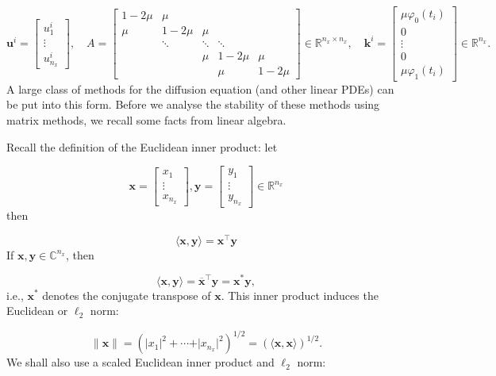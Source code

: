 \documentclass[12pt,landscape]{article}
\begin{document}
{\[
\mathbf{u}^i = \begin{bmatrix}
u^{i}_{1} \\
\vdots \\
u^{i}_{n_x}
\end{bmatrix}, \quad A = \begin{bmatrix}
1 - 2\mu & \mu & & & \\
\mu  & 1-2\mu & \mu  & & \\
      & \ddots & \ddots & \ddots & \\
      &        & \mu    & 1- 2\mu & \mu \\
      &        &        &\mu      & 1-2\mu
\end{bmatrix} \in \mathbb{R}^{n_x \times n_x}, \quad \mathbf{k}^i=
\begin{bmatrix}
\mu\varphi_0(t_i) \\
0 \\
\vdots \\
0 \\
\mu \varphi_1(t_i)
\end{bmatrix} \in \mathbb{R}^{n_x}.
\]
A large class of methods for the diffusion equation (and other linear PDEs) can be put into this form.  Before we analyse the stability of these methods using matrix methods, we recall some facts from linear algebra.

Recall the definition of the Euclidean inner product: let

\[
\mathbf{x} = \begin{bmatrix}
x_1 \\
\vdots \\
x_{n_x}
\end{bmatrix},  \mathbf{y} = \begin{bmatrix}
y_1 \\
\vdots \\
y_{n_x}
\end{bmatrix}  \in \mathbb{R}^{n_x}
\]
then

\[
\langle \mathbf{x}, \mathbf{y}\rangle = \mathbf{x}^{\top}\mathbf{y}
\]
If $\mathbf{x}, \mathbf{y} \in \mathbb{C}^{n_x}$, then

\[
\langle \mathbf{x}, \mathbf{y}\rangle = \overline{\mathbf{x}}^{\top}\mathbf{y} = \mathbf{x}^*\mathbf{y},
\]
i.e., $\mathbf{x}^*$ denotes the conjugate transpose of $\mathbf{x}$. This inner product induces the Euclidean or $\ell_2$ norm:

\[
\| \mathbf{x} \| = \left(\vert x_1\vert^2 + \cdots + \vert x_{n_x}\vert^2  \right)^{1/2}  = \left(\langle\mathbf{x},\mathbf{x}\rangle\right)^{1/2}.
\]
We shall also use a scaled Euclidean inner product and $\ell_2$ norm:

}
\end{document}
